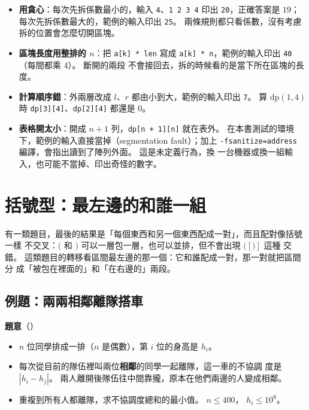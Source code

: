 \begin{itemize}
\item \textbf{用貪心}：每次先拆係數最小的，輸入 \texttt{4}、\texttt{1 2 3 4}
印出 \texttt{20}，正確答案是 $19$；每次先拆係數最大的，範例的輸入印出
\texttt{25}。 兩條規則都只看係數，沒有考慮拆的位置會怎麼切開區塊。
\item \textbf{區塊長度用整排的 $n$}：把 \texttt{a[k] * len} 寫成
\texttt{a[k] * n}，範例的輸入印出 \texttt{40}（每間都乘 $4$）。 斷開的兩段
不會接回去，拆的時候看的是當下所在區塊的長度。
\item \textbf{計算順序錯}：外兩層改成 $l$、$r$ 都由小到大，範例的輸入印出
\texttt{7}。 算 $\mathrm{dp}(1, 4)$ 時 \texttt{dp[3][4]}、\texttt{dp[2][4]}
都還是 $0$。
\item \textbf{表格開太小}：開成 $n + 1$ 列，\texttt{dp[n + 1][n]} 就在表外。
在本書測試的環境下，範例的輸入直接當掉（segmentation fault）；加上
\texttt{-fsanitize=address} 編譯，會指出讀到了陣列外面。 這是未定義行為，換
一台機器或換一組輸入，也可能不當掉、印出奇怪的數字。
\end{itemize}

\section{括號型：最左邊的和誰一組}
\label{sec:ivdp-pair}

有一類題目，最後的結果是「每個東西和另一個東西配成一對」，而且配對像括號一樣
不交叉：$($ 和 $)$ 可以一層包一層，也可以並排，但不會出現 $( [ ) ]$ 這種
交錯。 這類題目的轉移看區間最左邊的那一個：它和誰配成一對，那一對就把區間分
成「被包在裡面的」和「在右邊的」兩段。

\subsection{例題：兩兩相鄰離隊搭車}
\label{sec:ex-ivdp-pairs}

\textbf{題意}（）

\begin{itemize}
\item $n$ 位同學排成一排（$n$ 是偶數），第 $i$ 位的身高是 $h_i$。
\item 每次從目前的隊伍裡叫兩位\textbf{相鄰}的同學一起離隊，這一車的不協調
度是 $|h_i - h_j|$。 兩人離開後隊伍往中間靠攏，原本在他們兩邊的人變成相鄰。
\item 重複到所有人都離隊，求不協調度總和的最小值。 $n \le 400$，
$h_i \le 10^9$。
\end{itemize}

